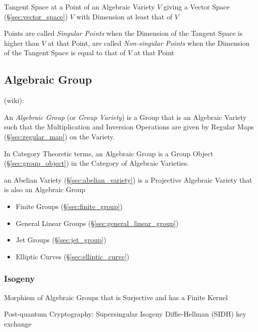 Tangent Space at a Point of an Algebraic Variety $V$ giving a Vector Space
(\S\ref{sec:vector_space}) $V$ with Dimension at least that of $V$

Points are called \emph{Singular Points} when the Dimension of the Tangent
Space is higher than $V$ at that Point, are called \emph{Non-singular Points}
when the Dimension of the Tangent Space is equal to that of $V$ at that Point



\subsection{Algebraic Group}\label{sec:algebraic_group}

(wiki):

An \emph{Algebraic Group} (or \emph{Group Variety}) is a Group that is an
Algebraic Variety such that the Multiplication and Inversion Operations are
given by Regular Maps (\S\ref{sec:regular_map}) on the Variety.

In Category Theoretic terms, an Algebraic Group is a Group Object
(\S\ref{sec:group_object}) in the Category of Algebraic Varieties.

\fist an Abelian Variety (\S\ref{sec:abelian_variety}) is a Projective Algebraic
Variety that is also an Algebraic Group

\begin{itemize}
  \item Finite Groups (\S\ref{sec:finite_group})
  \item General Linear Groups (\S\ref{sec:general_linear_group})
  \item Jet Groups (\S\ref{sec:jet_group})
  \item Elliptic Curves (\S\ref{sec:elliptic_curve})
\end{itemize}



\subsubsection{Isogeny}\label{sec:isogeny}

Morphism of Algebraic Groups that is Surjective and has a Finite Kernel

Post-quantum Cryptography: Supersingular Isogeny Diffie-Hellman (SIDH) key
exchange



